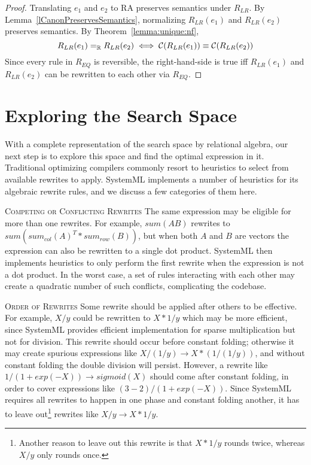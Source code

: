 \begin{proof}
  Translating $e_1$ and $e_2$ to RA preserves semantics under
  $R_{LR}$. By Lemma~\ref{lCanonPreservesSemantics}, normalizing
  $R_{LR}(e_1)$ and $R_{LR}(e_2)$ preserves semantics. By Theorem~\ref{lemma:unique:nf}, $$R_{LR}(e_1) =_{\mathbb R} R_{LR}(e_2) \iff \mathcal{C}(R_{LR}(e_1)) \equiv \mathcal{C}(R_{LR}(e_2))$$ Since every rule in $R_{EQ}$ is reversible, the right-hand-side is true iff $R_{LR}(e_1)$ and $R_{LR}(e_2)$ can be rewritten to each other via $R_{EQ}$. 
\end{proof}

\section{Exploring the Search Space} \label{explore}


With a complete representation of the search space by relational algebra, our
next step is to explore this space and find the optimal expression in it.
Traditional optimizing compilers commonly resort to heuristics to select from
available rewrites to apply. SystemML implements a number of heuristics for its
algebraic rewrite rules, and we discuss a few categories of them here.

\textsc{Competing or Conflicting Rewrites} The same expression may be eligible
for more than one rewrites. For example, $sum(AB)$ rewrites to
$sum(sum_{col}(A)^T*sum_{row}(B))$, but when both $A$ and $B$ are vectors the
expression can also be rewritten to a single dot product. SystemML then
implements heuristics to only perform the first rewrite when the expression is
not a dot product. In the worst case, a set of rules interacting with each other
may create a quadratic number of such conflicts, complicating the codebase.

\textsc{Order of Rewrites} Some rewrite should be applied after others to be
effective. For example, $X/y$ could be rewritten to $X*1/y$ which may be more
efficient, since SystemML provides efficient implementation for sparse
multiplication but not for division. This rewrite should occur before constant
folding; otherwise it may create spurious expressions like $X / (1/y)
\rightarrow X * (1/(1/y))$, and without constant folding the double division
will persist. However, a rewrite like $1/(1 + exp(-X)) \rightarrow sigmoid(X)$
should come after constant folding, in order to cover expressions like $(3-2)/(1
+ exp(-X))$. Since SystemML requires all rewrites to happen in one phase and
constant folding another, it has to leave out\footnote{Another reason to leave
  out this rewrite is that $X*1/y$ rounds twice, whereas $X/y$ only rounds
  once.} rewrites like $X/y \rightarrow X*1/y$.


